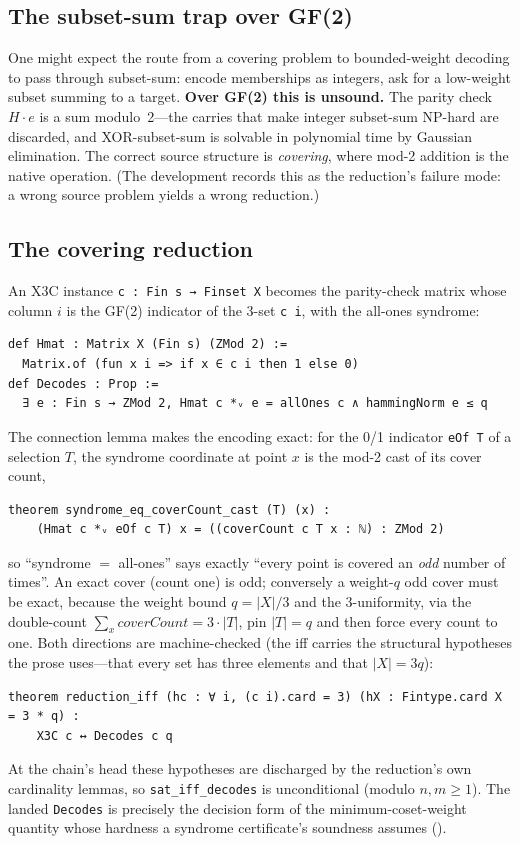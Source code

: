 \documentclass[a4paper,UKenglish,cleveref,autoref]{lipics-v2021}
\begin{document}
\subsection{The subset-sum trap over GF(2)}\label{sec:trap}

One might expect the route from a covering problem to bounded-weight decoding to pass through subset-sum:
encode memberships as integers, ask for a low-weight subset summing to a target. \textbf{Over GF(2) this is
unsound.} The parity check $H \cdot e$ is a sum modulo~2---the carries that make integer subset-sum NP-hard are
discarded, and XOR-subset-sum is solvable in polynomial time by Gaussian elimination. The correct source
structure is \emph{covering}, where mod-2 addition is the native operation. (The development records this as the
reduction's failure mode: a wrong source problem yields a wrong reduction.)

\subsection{The covering reduction}\label{sec:covering}

An X3C instance \lstinline{c : Fin s → Finset X} becomes the parity-check matrix whose column $i$ is the GF(2)
indicator of the 3-set \lstinline{c i}, with the all-ones syndrome:
\begin{lstlisting}
def Hmat : Matrix X (Fin s) (ZMod 2) :=
  Matrix.of (fun x i => if x ∈ c i then 1 else 0)
def Decodes : Prop :=
  ∃ e : Fin s → ZMod 2, Hmat c *ᵥ e = allOnes c ∧ hammingNorm e ≤ q
\end{lstlisting}
The connection lemma makes the encoding exact: for the 0/1 indicator \lstinline{eOf T} of a selection $T$, the
syndrome coordinate at point $x$ is the mod-2 cast of its cover count,
\begin{lstlisting}
theorem syndrome_eq_coverCount_cast (T) (x) :
    (Hmat c *ᵥ eOf c T) x = ((coverCount c T x : ℕ) : ZMod 2)
\end{lstlisting}
so ``syndrome $=$ all-ones'' says exactly ``every point is covered an \emph{odd} number of times''. An exact
cover (count one) is odd; conversely a weight-$q$ odd cover must be exact, because the weight bound
$q = |X|/3$ and the 3-uniformity, via the double-count $\sum_x \mathit{coverCount} = 3 \cdot |T|$, pin
$|T| = q$ and then force every count to one. Both directions are machine-checked (the iff carries the
structural hypotheses the prose uses---that every set has three elements and that $|X| = 3q$):
\begin{lstlisting}
theorem reduction_iff (hc : ∀ i, (c i).card = 3) (hX : Fintype.card X = 3 * q) :
    X3C c ↔ Decodes c q
\end{lstlisting}
At the chain's head these hypotheses are discharged by the reduction's own cardinality lemmas, so
\lstinline{sat_iff_decodes} is unconditional (modulo $n, m \ge 1$). The landed \lstinline{Decodes} is precisely
the decision form of the minimum-coset-weight quantity whose hardness a syndrome certificate's soundness
assumes ().
\end{document}
